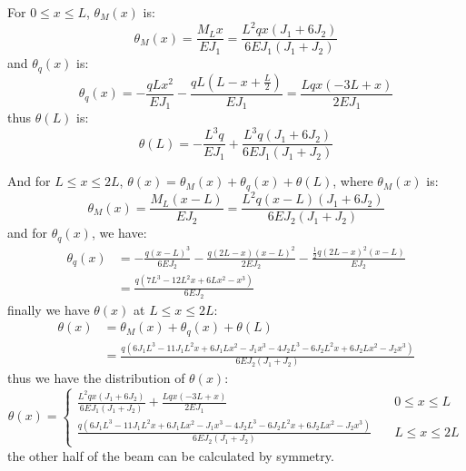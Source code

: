 For $0 \leq x \leq L$, $\theta_M(x)$ is:
\begin{equation}
    \theta_M(x) = 
    \frac{M_L x}{EJ_1}=
    \frac{L^{2} q x \left(J_{1} + 6 J_{2}\right)}{6 E J_{1} \left(J_{1} + J_{2}\right)}
\end{equation}
and $\theta_q(x)$ is:
\begin{equation}
    \theta_q(x)=
    -\frac{qL x^2}{EJ_1}-
    \frac{qL\left(L-x+\frac{L}{2}\right)}{EJ_1}=
    \frac{L q x \left(- 3 L + x\right)}{2 E J_{1}}
\end{equation}
thus $\theta(L)$ is:
\begin{equation}
    \theta(L) = 
    - \frac{L^{3} q}{E J_{1}} + \frac{L^{3} q \left(J_{1} + 6 J_{2}\right)}{6 E J_{1} \left(J_{1} + J_{2}\right)}
\end{equation}

And for $L \leq x \leq 2L$, $\theta(x)=\theta_M(x) + \theta_q(x) + \theta(L)$, where
$\theta_M(x)$ is:
\begin{equation}
    \theta_M(x) = 
    \frac{M_L (x-L)}{EJ_2}=
    \frac{L^{2} q (x-L) \left(J_{1} + 6 J_{2}\right)}{6 E J_{2} \left(J_{1} + J_{2}\right)}
\end{equation}
and for $\theta_q(x)$, we have:
\begin{equation}
    \begin{aligned}
        \theta_q(x) &= 
    -\frac{q(x-L)^3}{6EJ_2}-
    \frac{q(2L-x) (x-L)^2}{2EJ_2}-
    \frac{\frac{1}{2}q (2L-x)^2 (x-L)}{EJ_2}\\
    &=
    \frac{q \left(7 L^{3} - 12 L^{2} x + 6 L x^{2} - x^{3}\right)}{6 E J_{2}}
    \end{aligned}
\end{equation}
finally we have $\theta(x)$ at $L \leq x \leq 2L$:
\begin{equation}
    \begin{aligned}
        \theta(x)&=
        \theta_M(x) + \theta_q(x) + \theta(L)\\
        &=
        \frac{q \left(6 J_{1} L^{3} - 11 J_{1} L^{2} x + 6 J_{1} L x^{2} - J_{1} x^{3} - 4 J_{2} L^{3} - 6 J_{2} L^{2} x + 6 J_{2} L x^{2} - J_{2} x^{3}\right)}{6 E J_{2} \left(J_{1} + J_{2}\right)}
    \end{aligned}
\end{equation}
thus we have the distribution of $\theta(x)$:
\begin{equation}
    \theta(x)=
    \begin{cases}
        \frac{L^{2} q x \left(J_{1} + 6 J_{2}\right)}{6 E J_{1} \left(J_{1} + J_{2}\right)} + \frac{L q x \left(- 3 L + x\right)}{2 E J_{1}}\quad &0 \leq x \leq L\\
        \frac{q \left(6 J_{1} L^{3} - 11 J_{1} L^{2} x + 6 J_{1} L x^{2} - J_{1} x^{3} - 4 J_{2} L^{3} - 6 J_{2} L^{2} x + 6 J_{2} L x^{2} - J_{2} x^{3}\right)}{6 E J_{2} \left(J_{1} + J_{2}\right)}
        \quad &L \leq x \leq 2L
    \end{cases}
\end{equation}
the other half of the beam can be calculated by symmetry.

